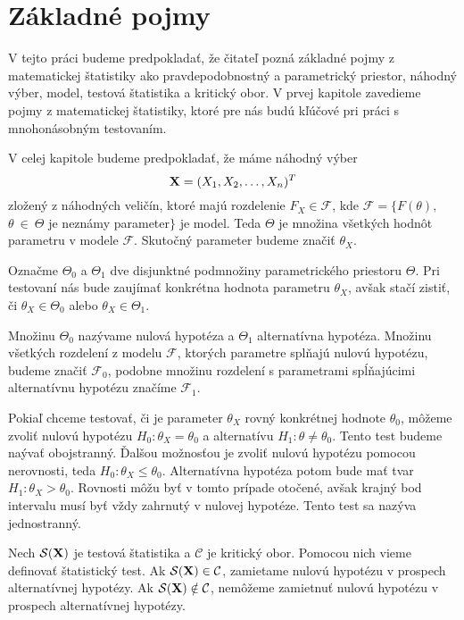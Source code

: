 \chapter{Základné pojmy}

V tejto práci budeme predpokladať, že čitateľ pozná základné pojmy z matematickej štatistiky ako pravdepodobnostný a parametrický priestor, náhodný výber, 
model, testová štatistika a kritický obor.
V prvej kapitole zavedieme pojmy z matematickej štatistiky, ktoré pre nás budú kľúčové pri práci s mnohonásobným testovaním. 

V celej kapitole budeme predpokladať, že máme náhodný výber $${\bf X} = (X_1, X_2, \dots, X_n)^T$$ zložený z náhodných veličín, 
ktoré majú rozdelenie $F_X \in \mathcal{F}$, kde $\mathcal{F} = \{F(\theta),$ $\theta~\in~\Theta$ je neznámy parameter$\}$ je model. 
Teda $\Theta$ je množina všetkých hodnôt parametru v modele $\mathcal{F}$. 
Skutočný parameter budeme značiť $\theta_X$. 

Označme $\Theta_0$ a $\Theta_1$ dve disjunktné podmnožiny parametrického priestoru $\Theta$. 
Pri testovaní nás bude zaujímať konkrétna hodnota parametru $\theta_X$, avšak stačí zistiť, 
či $\theta_X \in \Theta_0$ alebo $\theta_X \in \Theta_1$. 

\begin{definicia}\label{def1}
  Množinu $\Theta_0$ nazývame nulová hypotéza a $\Theta_1$ alternatívna hypotéza. 
  Množinu všetkých rozdelení z modelu $\mathcal{F}$, ktorých parametre splňajú nulovú hypotézu, budeme značiť $\mathcal{F}_0$, 
  podobne množinu rozdelení s parametrami spĺňajúcimi alternatívnu hypotézu značíme $\mathcal{F}_1$. 
\end{definicia}  

Pokiaľ chceme testovať, či je parameter $\theta_X$ rovný konkrétnej hodnote $\theta_0$, môžeme zvoliť nulovú hypotézu 
$H_0: \theta_X = \theta_0$ a alternatívu $H_1: \theta \neq \theta_0$. Tento test budeme naývať obojstranný. 
Ďalšou možnosťou je zvoliť nulovú hypotézu pomocou nerovnosti, teda $H_0: \theta_X \leq \theta_0$. Alternatívna hypotéza 
potom bude mať tvar $H_1: \theta_X > \theta_0$. Rovnosti môžu byť v tomto prípade otočené, avšak krajný bod intervalu musí 
byť vždy zahrnutý v nulovej hypotéze. Tento test sa nazýva jednostranný. 

\begin{definicia}\label{def2}
  Nech $\mathcal{S}({\bf X})$ je testová štatistika a $\mathcal{C}$ je kritický obor. Pomocou nich vieme definovať štatistický test. 
  Ak $\mathcal{S}({\bf X}) \in \mathcal{C}$, zamietame nulovú hypotézu v prospech alternatívnej hypotézy.  
  Ak $\mathcal{S}({\bf X}) \notin \mathcal{C}$, nemôžeme zamietnuť nulovú hypotézu v prospech alternatívnej hypotézy. 
\end{definicia}

